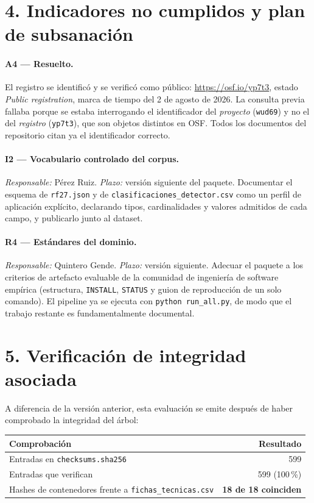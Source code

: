 \documentclass[11pt,a4paper]{article}
\begin{document}
\section*{4. Indicadores no cumplidos y plan de subsanación}

\paragraph{A4 --- Resuelto.}
El registro se identificó y se verificó como público: \url{https://osf.io/yp7t3},
estado \textit{Public registration}, marca de tiempo del 2 de agosto de 2026.
La consulta previa fallaba porque se estaba interrogando el identificador del
\textit{proyecto} (\texttt{wud69}) y no el del \textit{registro}
(\texttt{yp7t3}), que son objetos distintos en OSF. Todos los documentos del
repositorio citan ya el identificador correcto.

\paragraph{I2 --- Vocabulario controlado del corpus.}
\textit{Responsable:} Pérez Ruiz. \textit{Plazo:} versión siguiente del paquete.
Documentar el esquema de \texttt{rf27.json} y de
\texttt{clasificaciones\_detector.csv} como un perfil de aplicación explícito,
declarando tipos, cardinalidades y valores admitidos de cada campo, y
publicarlo junto al dataset.

\paragraph{R4 --- Estándares del dominio.}
\textit{Responsable:} Quintero Gende. \textit{Plazo:} versión siguiente.
Adecuar el paquete a los criterios de artefacto evaluable de la comunidad de
ingeniería de software empírica (estructura, \texttt{INSTALL}, \texttt{STATUS} y
guion de reproducción de un solo comando). El pipeline ya se ejecuta con
\texttt{python run\_all.py}, de modo que el trabajo restante es
fundamentalmente documental.

\section*{5. Verificación de integridad asociada}

A diferencia de la versión anterior, esta evaluación se emite después de haber
comprobado la integridad del árbol:

\begin{center}
\begin{tabular}{lr}
\toprule
\textbf{Comprobación} & \textbf{Resultado} \\
\midrule
Entradas en \texttt{checksums.sha256} & 599 \\
Entradas que verifican & 599 (100\,\%) \\
Hashes de contenedores frente a \texttt{fichas\_tecnicas.csv} & \textbf{18 de 18 coinciden} \\
\bottomrule
\end{tabular}
\end{center}
\end{document}
